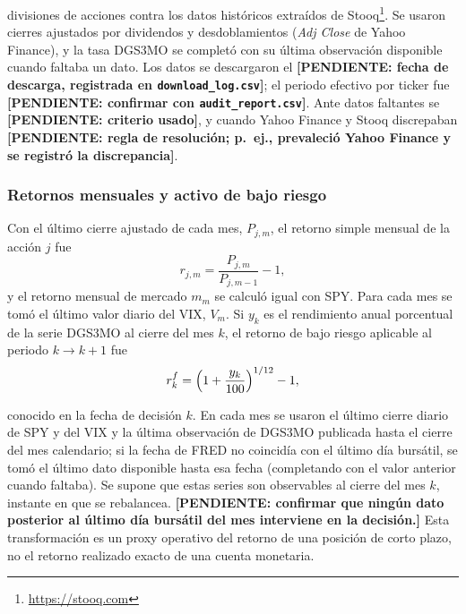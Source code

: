 divisiones de acciones contra los datos históricos extraídos de Stooq\footnote{\url{https://stooq.com}}. Se usaron cierres ajustados por dividendos y desdoblamientos (\emph{Adj Close} de Yahoo Finance), y la tasa DGS3MO se completó con su última observación disponible cuando faltaba un dato. Los datos se descargaron el \textbf{[PENDIENTE: fecha de descarga, registrada en \texttt{download\_log.csv}]}; el periodo efectivo por ticker fue \textbf{[PENDIENTE: confirmar con \texttt{audit\_report.csv}]}. Ante datos faltantes se \textbf{[PENDIENTE: criterio usado]}, y cuando Yahoo Finance y Stooq discrepaban \textbf{[PENDIENTE: regla de resolución; p.~ej., prevaleció Yahoo Finance y se registró la discrepancia]}.


\subsubsection{Retornos mensuales y activo de bajo riesgo}

Con el último cierre ajustado de cada mes, $P_{j,m}$, el retorno simple mensual de la acción $j$ fue
\begin{equation}\label{eq:ret}
r_{j,m}=\frac{P_{j,m}}{P_{j,m-1}}-1,
\end{equation}
y el retorno mensual de mercado $m_m$ se calculó igual con SPY. Para cada mes se tomó el último valor diario del VIX, $V_m$. Si $y_k$ es el rendimiento anual porcentual de la serie DGS3MO al cierre del mes $k$, el retorno de bajo riesgo aplicable al periodo $k\to k+1$ fue
\begin{equation}\label{eq:rf}
r^f_k=\Bigl(1+\frac{y_k}{100}\Bigr)^{1/12}-1,
\end{equation}

conocido en la fecha de decisión $k$. En cada mes se usaron el último cierre diario de SPY y del VIX y la última observación de DGS3MO publicada hasta el cierre del mes calendario; si la fecha de FRED no coincidía con el último día bursátil, se tomó el último dato disponible hasta esa fecha (completando con el valor anterior cuando faltaba). Se supone que estas series son observables al cierre del mes $k$, instante en que se rebalancea. \textbf{[PENDIENTE: confirmar que ningún dato posterior al último día bursátil del mes interviene en la decisión.]} Esta transformación es un proxy
 operativo del retorno de una posición de corto plazo, no el retorno realizado exacto de una cuenta monetaria.

